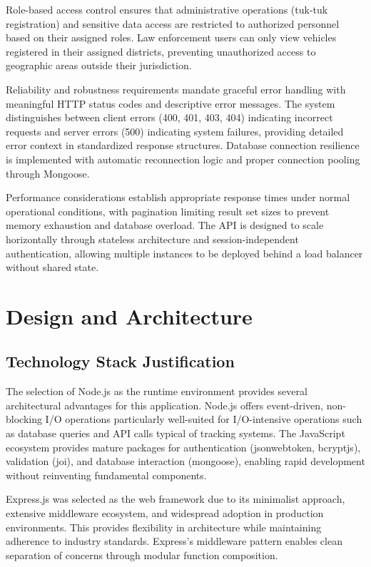 \documentclass[12pt,a4paper]{article}
\begin{document}
Role-based access control ensures that administrative operations (tuk-tuk registration) and sensitive data access are restricted to authorized personnel based on their assigned roles. Law enforcement users can only view vehicles registered in their assigned districts, preventing unauthorized access to geographic areas outside their jurisdiction.

Reliability and robustness requirements mandate graceful error handling with meaningful HTTP status codes and descriptive error messages. The system distinguishes between client errors (400, 401, 403, 404) indicating incorrect requests and server errors (500) indicating system failures, providing detailed error context in standardized response structures. Database connection resilience is implemented with automatic reconnection logic and proper connection pooling through Mongoose.

Performance considerations establish appropriate response times under normal operational conditions, with pagination limiting result set sizes to prevent memory exhaustion and database overload. The API is designed to scale horizontally through stateless architecture and session-independent authentication, allowing multiple instances to be deployed behind a load balancer without shared state.

\section{Design and Architecture}

\subsection{Technology Stack Justification}

The selection of Node.js as the runtime environment provides several architectural advantages for this application. Node.js offers event-driven, non-blocking I/O operations particularly well-suited for I/O-intensive operations such as database queries and API calls typical of tracking systems. The JavaScript ecosystem provides mature packages for authentication (jsonwebtoken, bcryptjs), validation (joi), and database interaction (mongoose), enabling rapid development without reinventing fundamental components.

Express.js was selected as the web framework due to its minimalist approach, extensive middleware ecosystem, and widespread adoption in production environments. This provides flexibility in architecture while maintaining adherence to industry standards. Express's middleware pattern enables clean separation of concerns through modular function composition.
\end{document}
